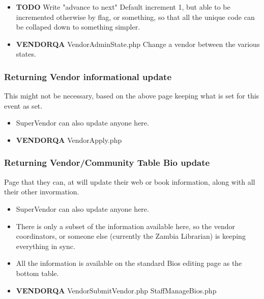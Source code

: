 \documentclass[captions=tablesignature]{scrartcl}
\begin{document}
\begin{itemize}
\item {\bfseries\sffamily TODO} Write "advance to next"
\label{sec-3-1-5-14}
Default increment 1, but able to be incremented otherwise by
flag, or something, so that all the unique code can be collaped
down to something simpler.

\item {\bfseries\sffamily VENDORQA} VendorAdminState.php
\label{sec-3-1-5-15}
Change a vendor between the various states.
\end{itemize}

\subsubsection{Returning Vendor informational update}
\label{sec-3-1-6}
This might not be necessary, based on the above page keeping what
is set for this event as set.
\begin{itemize}
\item SuperVendor can also update anyone here.
\end{itemize}
\begin{itemize}
\item {\bfseries\sffamily VENDORQA} VendorApply.php
\label{sec-3-1-6-1}
\end{itemize}

\subsubsection{Returning Vendor/Community Table Bio update}
\label{sec-3-1-7}
Page that they can, at will update their web or book information,
along with all their other invormation.
\begin{itemize}
\item SuperVendor can also update anyone here.
\item There is only a subset of the information available here, so
the vendor coordinators, or someone else (currently the Zambia
Librarian) is keeping everything in sync.
\item All the information is available on the standard Bios editing
page as the bottom table.
\end{itemize}
\begin{itemize}
\item {\bfseries\sffamily VENDORQA} VendorSubmitVendor.php StaffManageBios.php
\label{sec-3-1-7-1}
\end{itemize}
\end{document}
